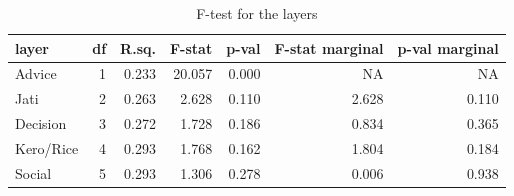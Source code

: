 \begin{table}

\caption{F-test for the layers}
\centering
\begin{tabular}[t]{lrrrrrr}
\toprule
layer & df & R.sq. & F-stat & p-val & F-stat marginal & p-val marginal\\
\midrule
Advice & 1 & 0.233 & 20.057 & 0.000 & NA & NA\\
Jati & 2 & 0.263 & 2.628 & 0.110 & 2.628 & 0.110\\
Decision & 3 & 0.272 & 1.728 & 0.186 & 0.834 & 0.365\\
Kero/Rice & 4 & 0.293 & 1.768 & 0.162 & 1.804 & 0.184\\
Social & 5 & 0.293 & 1.306 & 0.278 & 0.006 & 0.938\\
\bottomrule
\end{tabular}
\end{table}
